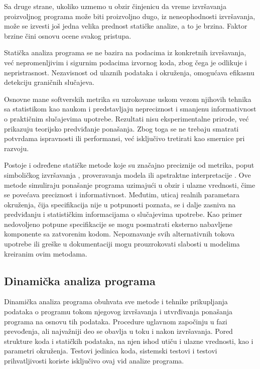 \documentclass[12pt,oneside]{memoir}
\begin{document}
Sa druge strane, ukoliko uzmemo u obzir činjenicu da vreme izvršavanja proizvoljnog programa može biti proizvoljno dugo, iz neneophodnosti izvršavanja, može se izvesti još jedna velika prednost statičke analize, a to je brzina. Faktor brzine čini osnovu ocene svakog pristupa.

Statička analiza programa se ne bazira na podacima iz konkretnih izvršavanja, već nepromenljivim i sigurnim podacima izvornog koda, zbog čega je odlikuje i nepristrasnost. Nezavisnost od ulaznih podataka i okruženja, omogućava efikasnu detekciju graničnih slučajeva.
 
Osnovne mane softverskih metrika su uzrokovane uskom vezom njihovih tehnika sa statistikom kao naukom i predstavljaju nepreciznost i smanjenu informativnost o praktičnim slučajevima upotrebe. Rezultati nisu eksperimentalne prirode, već prikazuju teorijsko predviđanje ponašanja. Zbog toga se ne trebaju smatrati potvrdama ispravnosti ili performansi, već isključivo tretirati kao smernice pri razvoju.

Postoje i određene statičke metode koje su značajno preciznije od metrika, poput simboličkog izvršavanja \cite{Simbolicko}, proveravanja modela \cite{TestModel} ili apstraktne interpretacije \cite{Apstraktno}. Ove metode simuliraju ponašanje programa uzimajući u obzir i ulazne vrednosti, čime se povećava preciznost i informativnost. Međutim, uticaj realnih parametara okruženja, čija specifikacija nije u potpunosti poznata, se i dalje zasniva na predviđanju i statističkim informacijama o slučajevima upotrebe. Kao primer nedovoljeno potpune specifikacije se mogu posmatrati eksterno nabavljene komponente sa zatvorenim kodom. Nepoznavanje svih alternativnih tokova upotrebe ili greške u dokumentaciji mogu prouzrokovati slabosti u modelima kreiranim ovim metodama.

\subsection{Dinamička analiza programa}

Dinamička analiza programa \cite{Gupta} obuhvata sve metode i tehnike prikupljanja podataka o programu tokom njegovog izvršavanja i utvrđivanja ponašanja programa na osnovu tih podataka. Procedure uglavnom započinju u fazi prevođenja, ali najvažniji deo se obavlja u toku i nakon izvršavanja. Pored strukture koda i statičkih podataka, na njen ishod utiču i ulazne vrednosti, kao i parametri okruženja. Testovi jedinica koda, sistemski testovi i testovi prihvatljivosti koriste isključivo ovaj vid analize programa. 
\end{document}
